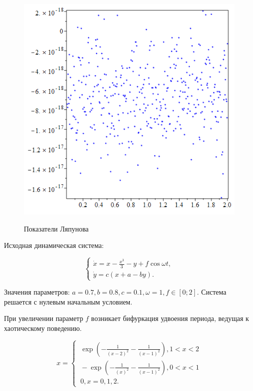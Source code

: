 \documentclass[10pt,a4paper]{article}
\begin{document}
\begin{figure}[h]
		{\includegraphics[scale=0.2]{lyapunov3 0.005}}
		\caption{Показатели Ляпунова}
		\label{image/2}
	\end{figure}

	Исходная динамическая система:

	\begin{equation}
		\label{math/1}
		\begin{cases}
			\dot{x} = x - \frac{x^3}{3} - y + f \cos \omega t, \\
			\dot{y} = c(x+a-b y).
		\end{cases}
	\end{equation}

	Значения параметров: $a = 0.7, b =0.8, c =0.1, \omega = 1, f \in [0; 2]$. Система решается с нулевым начальным условием.

	При увеличении параметр $f$ возникает бифуркация удвоения периода, ведущая к хаотическому поведению.
	
	\begin{equation}
		\label{math/1}
		x = 
		\begin{cases}
			\ \exp(-\frac{1}{(x-2)^2} - \frac{1}{(x-1)^2}), 1 < x < 2\\
			\ -\exp(-\frac{1}{(x)^2} - \frac{1}{(x-1)^2}), 0 < x < 1\\
			\ 0, x={0, 1, 2}.
		\end{cases}
	\end{equation}
	
\end{document}
